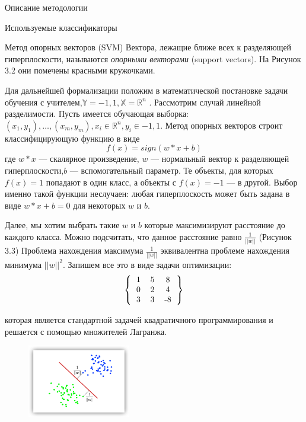 \begin{section}{Описание методологии}
\begin{subsection}{Используемые классификаторы}
\begin{subsubsection}{Метод опорных векторов (SVM)}
Вектора, лежащие ближе всех к разделяющей гиперплоскости, называются \textit{опорными векторами} (support vectors). На Рисунок 3.2 они помечены красными кружочками.

Для дальнейшей формализации положим в математической постановке задачи обучения с учителем,$\mathbb{Y} = {-1,1}, \mathbb{X} = \mathbb{R}^n$ .
Рассмотрим случай линейной разделимости. Пусть имеется обучающая выборка: $(x_1,y_1 ),…,(x_m,y_m ),x_i \in \mathbb{R}^n,y_i \in {-1,1}$.
Метод опорных векторов строит классифицирующую функцию  в виде
\begin{equation}
  f(x)=sign (w * x + b)
\end{equation}
где $w * x$ — скалярное произведение, $w$  — нормальный вектор к разделяющей гиперплоскости,$b$  — вспомогательный параметр. Те объекты, для которых $f(x) = 1$ попадают в один класс, а объекты с $f(x) = -1$ — в другой. Выбор именно такой функции неслучаен: любая гиперплоскость может быть задана в виде $w * x + b = 0$ для некоторых $w$ и $b$.

Далее, мы хотим выбрать такие $w$ и $b$ которые максимизируют расстояние до каждого класса. Можно подсчитать, что данное расстояние равно $\frac{1}{||w||}$ (Рисунок 3.3) Проблема нахождения максимума $\frac{1}{||w||}$ эквивалентна проблеме нахождения минимума $||w||^2$. Запишем все это в виде задачи оптимизации:
\begin{equation}
  \left \{
    \begin{tabular}{ccc}
    1 & 5 & 8 \\
    0 & 2 & 4 \\
    3 & 3 & -8
    \end{tabular}
  \right \}
\end{equation}

которая является стандартной задачей квадратичного программирования и решается с помощью множителей Лагранжа.

\begin{figure}[ht!]
\centering
\includegraphics[width=0.4\textwidth]{pics/SVM3}
\caption{}
\label{pic:SVM3}
\end{figure}


\end{subsubsection}
\end{subsection}
\end{section}
